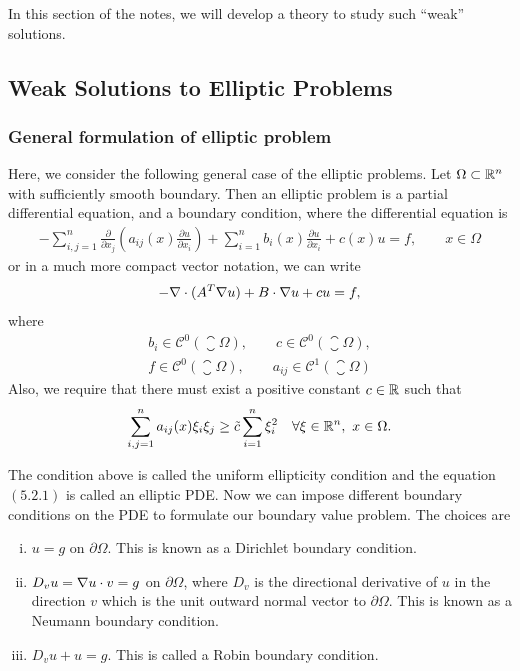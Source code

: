 \FloatBarrier
In this section of the notes, we will develop a theory to study such ``weak'' solutions.


\subsection{Weak Solutions to Elliptic Problems}

\subsubsection*{General formulation of elliptic problem}
Here, we consider the following general case of the elliptic problems. Let $ \Omega \subset \mathbb{R}^n $ with sufficiently smooth boundary. Then an elliptic problem is a partial differential equation, and a boundary condition, where the differential equation is
\begin{align*}
	 -\sum_{i,j=1}^{n}\frac{\partial}{\partial x_j}(a_{ij}(x) \frac{\partial u}{\partial x_i}) + \sum_{i=1}^{n}b_i(x) \frac{\partial u}{\partial x_i} + c(x) u = f, \qquad x \in \Omega \tag{5.2.1}
\end{align*}
or in a much more compact vector notation, we can write
\[  -\nabla\cdot(A^T \nabla u) + B \cdot \nabla u + c u = f,  \]
where
\begin{align*}
	b_i \in \mathscr{C}^0(\closure{\Omega}), \qquad c \in \mathscr{C}^0(\closure{\Omega}),\\
	f \in \mathscr{C}^0(\closure{\Omega}), \qquad a_{ij} \in \mathscr{C}^1(\closure{\Omega}) \tag{5.2.1.C}
\end{align*}
Also, we require that there must exist a positive constant $ c \in \mathbb{R} $ such that
 \begin{equation}
	\sum_{i,j=1}^{n} a_{ij}(x) \xi_i \xi_j \geq \tilde{c} \sum_{i=1}^{n}\xi_i^2 \quad \forall \xi \in \mathbb{R}^n,\ x \in \Omega. 
\label{equ:ellipticityCondition}
\end{equation}

The condition above is called the uniform ellipticity condition and the equation $ (5.2.1) $ is called an elliptic PDE. Now we can impose different boundary conditions on the PDE to formulate our boundary value problem. The choices are
\begin{enumerate}[(i)]	
	\item $ u = g $ on $ \partial \Omega $. This is known as a Dirichlet boundary condition.
	\item $ D_v u = \nabla u\cdot v = g $ on $ \partial \Omega $, where $ D_v $ is the directional derivative of $ u $ in the direction $ v $ which is the unit outward normal vector to $ \partial \Omega $. This is known as a Neumann boundary condition. 
	\item $ D_v u + u = g $. This is called a Robin boundary condition.
\end{enumerate}

